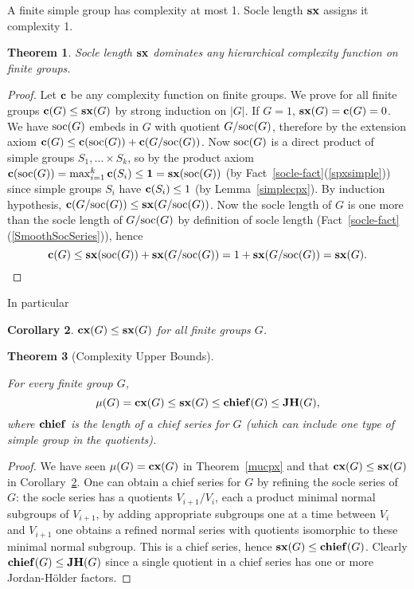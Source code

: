 \documentclass[a4paper,11pt]{amsart}
\newtheorem{theorem}{Theorem}[section]
\newtheorem{corollary}[theorem]{Corollary}
\theoremstyle{definition}
\newcommand{\cx}{\mbox{\bf cx}}
\renewcommand{\c}{\mbox{\bf c}}
\newcommand{\sx}{{\bf sx}}
\newcommand{\chief}{{\bf chief}}
\newcommand{\JH}{{\bf JH}}
\newcommand{\soc}{\mbox{\rm soc}}
\newcommand{\1}{{\mathbf 1}}
\begin{document}
A finite simple group has complexity at most 1.  Socle length $\sx$ assigns it complexity 1. 



\begin{theorem} Socle length $\sx$ dominates any hierarchical complexity function on finite groups.  \label{dom}
\end{theorem}
\begin{proof}
Let $\c$ be any complexity function on finite groups.
We prove for all finite groups $ \c(G) \leq \sx (G)$ by strong induction on $|G|$.  
If $G=1$, $\sx(G)=\c(G)=0$. 
We have $\soc(G)$ embeds in $G$ with quotient $G/\soc(G)$, therefore by the extension axiom
$\c(G) \leq \c(\soc(G)) + \c(G/\soc(G))$.
Now $\soc(G)$ is a direct product of simple groups $S_1, \ldots \times S_k$, so by the product axiom  $\c(\soc(G)) = \max_{i=1}^k \c(S_i) \leq \1=\sx(\soc(G))$ (by Fact~\ref{socle-fact}(\ref{spxsimple})) since simple groups $S_i$ have $\c(S_i)\leq 1$ (by Lemma~\ref{simplecpx}).
By induction hypothesis, $\c(G/\soc(G)) \leq\sx(G/\soc(G))$.
Now the socle length of $G$ is one more than the socle length of $G/\soc(G)$ by definition of socle length (Fact~\ref{socle-fact}(\ref{SmoothSocSeries})), hence $$\c(G) \leq \sx(\soc(G))+ \sx(G/\soc(G))=1+\sx(G/\soc(G))=\sx(G).$$   \end{proof}

In particular 
\begin{corollary}\label{upperbound}
$\cx(G) \leq \sx(G)$ for all finite groups $G$.
\end{corollary}



\begin{theorem}[Complexity Upper Bounds]\label{upperbounds}

For every finite group $G$,
$$ \mu(G) =\cx(G)\leq \sx(G) \leq \chief(G) \leq \JH(G),$$
where $\chief$ is the length of a chief series for $G$ (which can include one type of simple group in the quotients).

\end{theorem}
\begin{proof}
We have seen $\mu(G)=\cx(G)$ in Theorem~\ref{mucpx} and that $\cx(G) \leq \sx(G)$ in Corollary~\ref{upperbound}.
One can obtain a chief series for $G$ by refining the socle series of $G$: the socle series has a quotients $V_{i+1}/V_i$, each  a product minimal normal subgroups of $V_{i+1}$, by adding appropriate subgroups one at a time between $V_i$ and $V_{i+1}$ one obtains a refined normal series with quotients isomorphic to these minimal normal subgroup. This is a chief series, hence $\sx(G) \leq \chief(G)$. 
Clearly $\chief(G)\leq \JH(G)$ since a single quotient in a chief series has one or more Jordan-H\"older factors. 
\end{proof}
\end{document}
